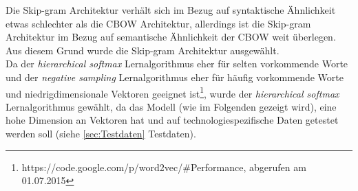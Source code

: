 \documentclass[12pt,a4paper]{report}
\begin{document}
Die Skip-gram Architektur verhält sich im Bezug auf syntaktische Ähnlichkeit etwas schlechter als die CBOW Architektur, allerdings ist die Skip-gram Architektur im Bezug auf semantische Ähnlichkeit der CBOW weit überlegen\citep{DBLP:journals/corr/abs-1301-3781}.\\ Aus diesem Grund wurde die Skip-gram Architektur ausgewählt.\\
Da der \textit{hierarchical softmax} Lernalgorithmus eher für selten vorkommende Worte und der \textit{negative sampling} Lernalgorithmus eher für häufig vorkommende Worte und niedrigdimensionale Vektoren geeignet ist\footnote{https://code.google.com/p/word2vec/\#Performance, abgerufen am 01.07.2015}, wurde der  \textit{hierarchical softmax} Lernalgorithmus gewählt, da das Modell (wie im Folgenden gezeigt wird), eine hohe Dimension an Vektoren hat und auf technologiespezifische Daten getestet werden soll (siehe \ref{sec:Testdaten} Testdaten).\\
\end{document}
